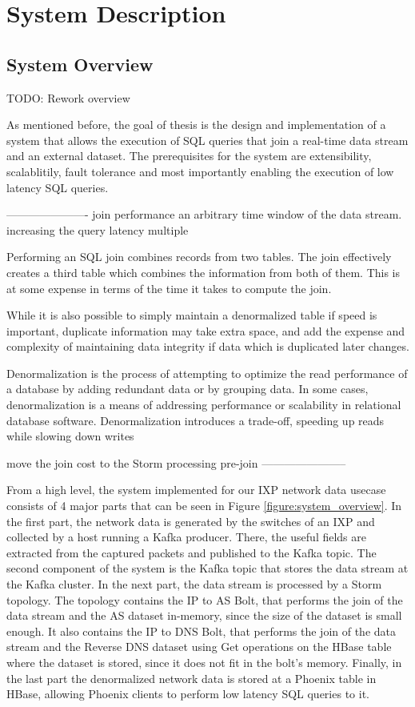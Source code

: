 \chapter{System Description}\label{chapter:system}

\section{System Overview}

TODO: Rework overview

As mentioned before, the goal of thesis is the design and implementation of a system that allows the execution of SQL queries that join a real-time data stream and an external dataset. The prerequisites for the system are extensibility, scalablitily, fault tolerance and most importantly enabling the execution of low latency SQL queries.

----------------------
join performance
an arbitrary time window of the data stream.
increasing the query latency
multiple

Performing an SQL join combines records from two tables. The join effectively creates a third table which combines the information from both of them. This is at some expense in terms of the time it takes to compute the join. 

While it is also possible to simply maintain a denormalized table if speed is important, duplicate information may take extra space, and add the expense and complexity of maintaining data integrity if data which is duplicated later changes.

Denormalization is the process of attempting to optimize the read performance of a database by adding redundant data or by grouping data. In some cases, denormalization is a means of addressing performance or scalability in relational database software. Denormalization introduces a trade-off, speeding up reads while slowing down writes 

move the join cost to the Storm processing
pre-join
-----------------------

From a high level, the system implemented for our IXP network data usecase consists of 4 major parts that can be seen in Figure \ref{figure:system_overview}. In the first part, the network data is generated by the switches of an IXP and collected by a host running a Kafka producer. There, the useful fields are extracted from the captured packets and published to the Kafka topic. The second component of the system is the Kafka topic that stores the data stream at the Kafka cluster. In the next part, the data stream is processed by a Storm topology. The topology contains the IP to AS Bolt, that performs the join of the data stream and the AS dataset in-memory, since the size of the dataset is small enough. It also contains the IP to DNS Bolt, that performs the join of the data stream and the Reverse DNS dataset using Get operations on the HBase table where the dataset is stored, since it does not fit in the bolt's memory. Finally, in the last part the denormalized network data is stored at a Phoenix table in HBase, allowing Phoenix clients to perform low latency SQL queries to it.


